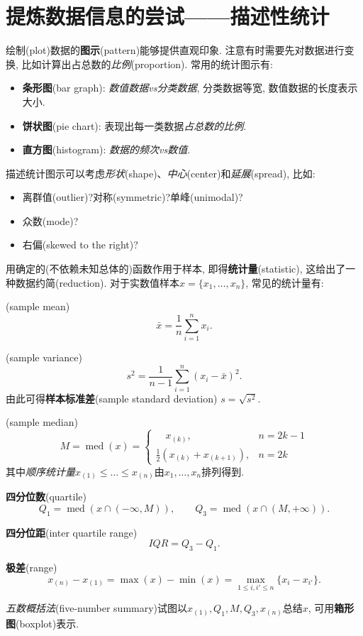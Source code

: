\section{提炼数据信息的尝试------描述性统计}
绘制(plot)数据的\textbf{图示}(pattern)能够提供直观印象. 注意有时需要先对数据进行变换, 比如计算出占总数的\emph{比例}(proportion). 常用的统计图示有:
\begin{itemize}
    \item \textbf{条形图}(bar graph): \emph{数值数据\textsf{vs}分类数据}, 分类数据等宽, 数值数据的长度表示大小.
    \item \textbf{饼状图}(pie chart): 表现出每一类数据\emph{占总数的比例}.
    \item \textbf{直方图}(histogram): \emph{数据的频次\textsf{vs}数值}.
\end{itemize}
描述统计图示可以考虑\emph{形状}(shape)、\emph{中心}(center)和\emph{延展}(spread), 比如:\vspace{-1ex}
\begin{itemize}
    \setlength{\itemsep}{-1ex}
    \item 离群值(outlier)?对称(symmetric)?单峰(unimodal)?
    \item 众数(mode)?
    \item 右偏(skewed to the right)?
\end{itemize}
\newpage

用确定的(不依赖未知总体的)函数作用于样本, 即得\textbf{统计量}(statistic), 这给出了一种数据约简(reduction). 对于实数值样本$x = \{x_{1},\dots,x_{n}\}$, 常见的统计量有: \label{descriptive-statistics}
\begin{description}
    \item [样本均值](sample mean)
          \[ \bar{x} = \frac{1}{n}\sum_{i=1}^{n}x_{i}. \]
    \item [样本方差](sample variance)
          \[ s^{2} = \frac{1}{n-1}\sum_{i=1}^{n}(x_{i}-\bar{x})^{2}. \]
          由此可得\textbf{样本标准差}(sample standard deviation) $s = \sqrt{s^2}$.
    \item [样本中位数](sample median)
          \[ M = \operatorname{med}(x) = \begin{cases}
                  \quad x_{(k)},                  & n = 2k-1 \\
                  \frac{1}{2}(x_{(k)}+x_{(k+1)}), & n = 2k
              \end{cases} \]
          其中\emph{顺序统计量}$x_{(1)}\leq\dots\leq x_{(n)}$由$x_{1},\dots,x_{n}$排列得到.
    \item \textbf{四分位数}(quartile)
          \[ Q_{1} = \operatorname{med}(x\cap(-\infty,M)), \qquad
              Q_{3} = \operatorname{med}(x\cap(M,+\infty)). \]
    \item \textbf{四分位距}(inter quartile range)
          \[ \mathit{IQR} = Q_{3} - Q_{1}. \]
    \item \textbf{极差}(range)
          \[ x_{(n)}-x_{(1)} = \max(x)-\min(x) = \max_{1\leq i,i' \leq n}\{x_{i}-x_{i'}\}. \]
\end{description}
\emph{五数概括法}(five-number summary)试图以$x_{(1)},Q_{1},M,Q_{3},x_{(n)}$总结$x$, 可用\textbf{箱形图}(boxplot)表示.


